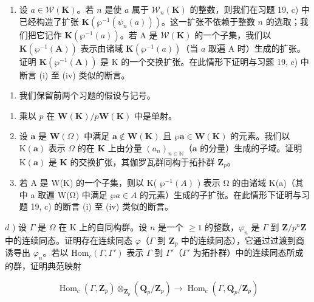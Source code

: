 \begin{enumerate}
\def\labelenumi{\alph{enumi})}
\setcounter{enumi}{2}
\tightlist
\item
  设 \(a \in \mathcal{W}(\mathbf{K})\)。若 \(n\) 是使 \(a\) 属于 \(\mathcal{W}_n(\mathbf{K})\) 的整数，则我们在习题 19, c) 中已经构造了扩张 \(\mathbf{K}(\wp^{-1}(\psi_n(a)))\)。这一扩张不依赖于整数 \(n\) 的选取；我们把它记作 \(\mathbf{K}(\wp^{-1}(a))\)。若 A 是 \(\mathcal{W}(\mathbf{K})\) 的一个子集，我们以 \(\mathbf{K}(\wp^{-1}(\mathbf{A}))\) 表示由诸域 \(\mathbf{K}(\wp^{-1}(a))\)（当 \(a\) 取遍 A 时）生成的扩张。证明 \(\mathbf{K}(\wp^{-1}(\mathbf{A}))\) 是 K 的一个交换扩张。在此情形下证明与习题 19, c) 中断言 (i) 至 (iv) 类似的断言。
\end{enumerate}

\begin{enumerate}
\def\labelenumi{\arabic{enumi})}
\setcounter{enumi}{20}
\tightlist
\item
  我们保留前两个习题的假设与记号。
\end{enumerate}

\begin{enumerate}
\def\labelenumi{\alph{enumi})}
\item
  乘以 \(p\) 在 \(\mathbf{W}(\mathbf{K}) / p\mathbf{W}(\mathbf{K})\) 中是单射。
\item
  设 \(\pmb{a}\) 是 \(\mathbf{W}(\Omega)\) 中满足 \(\pmb{a} \notin \mathbf{W}(\mathbf{K})\) 且 \(\wp \pmb{a} \in \mathbf{W}(\mathbf{K})\) 的元素。我们以 \(\mathrm{K}(\pmb{a})\) 表示 \(\Omega\) 的在 \(\mathbf{K}\) 上由分量 \((a_n)_{n \in \mathbb{N}}\)（\(\pmb{a}\) 的分量）生成的子域。证明 \(\mathrm{K}(\pmb{a})\) 是 \(\mathbf{K}\) 的交换扩张，其伽罗瓦群同构于拓扑群 \(\mathbf{Z}_p\)。
\item
  若 A 是 W(K) 的一个子集，则以 K( \(\wp^{-1}(A)\) ) 表示 Ω 的由诸域 K(a)（其中 a 取遍 W(Ω) 中满足 \(\wp a \in A\) 的元素）生成的子扩张。在此情形下证明与习题 19, c) 的断言 (i) 至 (iv) 类似的断言。
\end{enumerate}

\(d\) ) 设 \(\Gamma\) 是 \(\Omega\) 在 K 上的自同构群。设 \(n\) 是一个 \(\geqslant 1\) 的整数，\(\varphi_{n}\) 是 \(\Gamma\) 到 \(\mathbf{Z} / p^{n}\mathbf{Z}\) 中的连续同态。证明存在连续同态 \(\varphi\)（\(\Gamma\) 到 \(\mathbf{Z}_{p}\) 中的连续同态），它通过过渡到商诱导出 \(\varphi_{n}\)。若以 \(\mathrm{Hom}_c(\Gamma, \Gamma')\) 表示 \(\Gamma\) 到 \(\Gamma'\)（\(\Gamma'\) 为拓扑群）中的连续同态所成的群，证明典范映射

\[
\operatorname{Hom} _ {c} (\Gamma , \mathbf {Z} _ {p}) \otimes_ {\mathbf {Z} _ {p}} (\mathbf {Q} _ {p} / \mathbf {Z} _ {p}) \rightarrow \operatorname{Hom} _ {c} (\Gamma , \mathbf {Q} _ {p} / \mathbf {Z} _ {p})
\]

